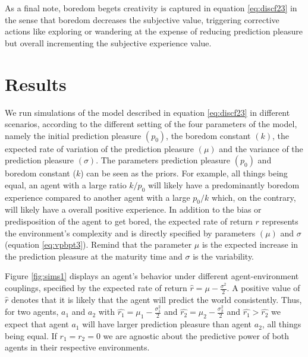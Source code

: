 \documentclass[11pt,twocolumn]{article}
\begin{document}
As a final note, boredom begets creativity is captured in equation \ref{eq:discf23} in the sense that boredom decreases the subjective value, triggering corrective actions like exploring or wandering at the expense of reducing prediction pleasure but overall incrementing the subjective experience value.

\section{Results}
\label{se:re}

We run simulations of the model described in equation \ref{eq:discf23} in different scenarios, according to the different setting of the four parameters of the model, namely the initial prediction pleasure $(p_0)$, the boredom constant $(k)$, the expected rate of variation of the prediction pleasure $(\mu)$ and the variance of the prediction pleasure $(\sigma)$. The parameters prediction pleasure $(p_0)$ and boredom constant ($k$) can be seen as the priors. For example, all things being equal, an agent with a large ratio $k/p_0$ will likely have a predominantly boredom experience compared to another agent with a large $p_0/k$ which, on the contrary, will likely have a overall positive experience. In addition to the bias or predisposition of the agent to get bored, the expected rate of return $r$ represents the environment's complexity and is directly specified by parameters $(\mu)$ and $\sigma$ (equation \ref{eq:vpbpt3}). Remind that the parameter $\mu$ is the expected increase in the prediction pleasure at the maturity time and $\sigma$ is the variability.

Figure \ref{fig:sims1} displays an agent's behavior under different agent-environment couplings, specified by the expected rate of return $\hat{r} = \mu - \frac{\sigma ^2}{2} $. A positive value of $\hat{r}$ denotes that it is likely that the agent will predict the world consistently. 
Thus, for two agents, $a_1$ and $a_2$ with $\hat{r_1} = \mu_1 - \frac{\sigma_1 ^2}{2}$ and $\hat{r_2} = \mu_2 - \frac{\sigma_2 ^2}{2}$ and $\hat{r_1} > \hat{r_2}$ we expect that agent $a_1$ will have larger prediction pleasure than agent $a_2$, all things being equal. If $r_1 =r_2 = 0$ we are agnostic about the predictive power of both agents in their respective environments.
\end{document}

